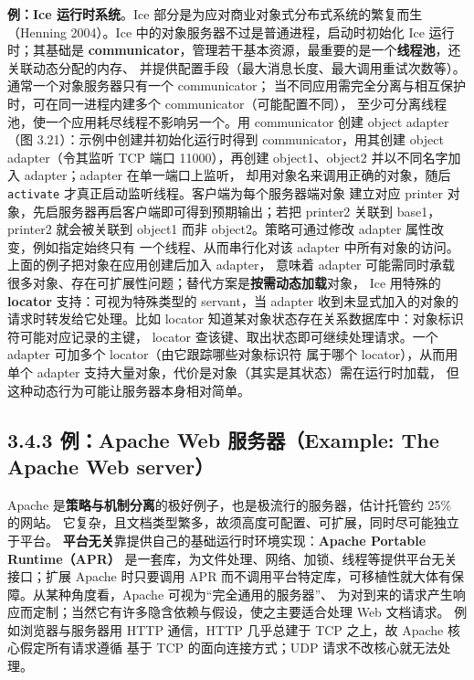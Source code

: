 \medskip\noindent\textbf{例：Ice 运行时系统}。Ice 部分是为应对商业对象式分布式系统的繁复而生
（Henning 2004）。Ice 中的对象服务器不过是普通进程，启动时初始化 Ice 运行时；其基础是
\textbf{communicator}，管理若干基本资源，最重要的是一个\textbf{线程池}，还关联动态分配的内存、
并提供配置手段（最大消息长度、最大调用重试次数等）。通常一个对象服务器只有一个 communicator；
当不同应用需完全分离与相互保护时，可在同一进程内建多个 communicator（可能配置不同），
至少可分离线程池，使一个应用耗尽线程不影响另一个。用 communicator 创建 object adapter
（图 3.21）：示例中创建并初始化运行时得到 communicator，用其创建 object adapter（令其监听
TCP 端口 11000），再创建 object1、object2 并以不同名字加入 adapter；adapter 在单一端口上监听，
却用对象名来调用正确的对象，随后 \texttt{activate} 才真正启动监听线程。客户端为每个服务器端对象
建立对应 printer 对象，先启服务器再启客户端即可得到预期输出；若把 printer2 关联到 base1，
printer2 就会被关联到 object1 而非 object2。策略可通过修改 adapter 属性改变，例如指定始终只有
一个线程、从而串行化对该 adapter 中所有对象的访问。上面的例子把对象在应用创建后加入 adapter，
意味着 adapter 可能需同时承载很多对象、存在可扩展性问题；替代方案是\textbf{按需动态加载}对象，
Ice 用特殊的 \textbf{locator} 支持：可视为特殊类型的 servant，当 adapter 收到未显式加入的对象的
请求时转发给它处理。比如 locator 知道某对象状态存在关系数据库中：对象标识符可能对应记录的主键，
locator 查该键、取出状态即可继续处理请求。一个 adapter 可加多个 locator（由它跟踪哪些对象标识符
属于哪个 locator），从而用单个 adapter 支持大量对象，代价是对象（其实是其状态）需在运行时加载，
但这种动态行为可能让服务器本身相对简单。

\begin{closeread}
\end{closeread}


\subsection*{3.4.3 例：Apache Web 服务器（Example: The Apache Web server）}
Apache 是\textbf{策略与机制分离}的极好例子，也是极流行的服务器，估计托管约 25\% 的网站。
它复杂，且文档类型繁多，故须高度可配置、可扩展，同时尽可能独立于平台。
\textbf{平台无关}靠提供自己的基础运行时环境实现：\textbf{Apache Portable Runtime（APR）}
是一套库，为文件处理、网络、加锁、线程等提供平台无关接口；扩展 Apache 时只要调用 APR
而不调用平台特定库，可移植性就大体有保障。从某种角度看，Apache 可视为“完全通用的服务器”、
为对到来的请求产生响应而定制；当然它有许多隐含依赖与假设，使之主要适合处理 Web 文档请求。
例如浏览器与服务器用 HTTP 通信，HTTP 几乎总建于 TCP 之上，故 Apache 核心假定所有请求遵循
基于 TCP 的面向连接方式；UDP 请求不改核心就无法处理。

